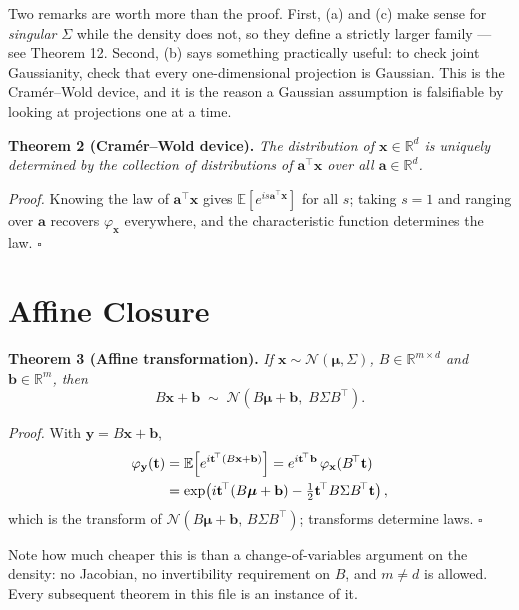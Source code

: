 \documentclass[conference]{IEEEtran}
\begin{document}
\medskip
Two remarks are worth more than the proof. First, (a) and (c) make sense for \textit{singular} $\Sigma$ while the density does not, so they define a strictly larger family --- see Theorem 12. Second, (b) says something practically useful: to check joint Gaussianity, check that every one-dimensional projection is Gaussian. This is the Cram\'er--Wold device, and it is the reason a Gaussian assumption is falsifiable by looking at projections one at a time.

\medskip
\noindent\textbf{Theorem 2 (Cram\'er--Wold device).}
\textit{The distribution of $\mathbf{x} \in \mathbb{R}^d$ is uniquely determined by the collection of distributions of $\mathbf{a}^{\!\top}\mathbf{x}$ over all $\mathbf{a} \in \mathbb{R}^d$.}

\medskip
\textit{Proof.} Knowing the law of $\mathbf{a}^{\!\top}\mathbf{x}$ gives $\mathbb{E}[e^{is\mathbf{a}^{\!\top}\mathbf{x}}]$ for all $s$; taking $s = 1$ and ranging over $\mathbf{a}$ recovers $\varphi_{\mathbf{x}}$ everywhere, and the characteristic function determines the law. $\square$

\section*{Affine Closure}
\noindent\textbf{Theorem 3 (Affine transformation).}
\textit{If $\mathbf{x} \sim \mathcal{N}(\boldsymbol{\mu},\Sigma)$, $B \in \mathbb{R}^{m \times d}$ and $\mathbf{b} \in \mathbb{R}^m$, then}
\begin{equation}
    B\mathbf{x} + \mathbf{b} \;\sim\; \mathcal{N}\!\left(B\boldsymbol{\mu} + \mathbf{b},\; B\Sigma B^{\!\top}\right).
\end{equation}

\medskip
\textit{Proof.} With $\mathbf{y} = B\mathbf{x} + \mathbf{b}$,
\begin{align}
    \varphi_{\mathbf{y}}(\mathbf{t})
    &= \mathbb{E}\!\left[e^{i\mathbf{t}^{\!\top}(B\mathbf{x}+\mathbf{b})}\right]
     = e^{i\mathbf{t}^{\!\top}\mathbf{b}}\,\varphi_{\mathbf{x}}(B^{\!\top}\mathbf{t}) \notag \\
    &= \exp\!\left(i\mathbf{t}^{\!\top}(B\boldsymbol{\mu}+\mathbf{b})
      - \tfrac{1}{2}\mathbf{t}^{\!\top}B\Sigma B^{\!\top}\mathbf{t}\right),
\end{align}
which is the transform of $\mathcal{N}(B\boldsymbol{\mu}+\mathbf{b},\, B\Sigma B^{\!\top})$; transforms determine laws. $\square$

\medskip
Note how much cheaper this is than a change-of-variables argument on the density: no Jacobian, no invertibility requirement on $B$, and $m \neq d$ is allowed. Every subsequent theorem in this file is an instance of it.
\end{document}
